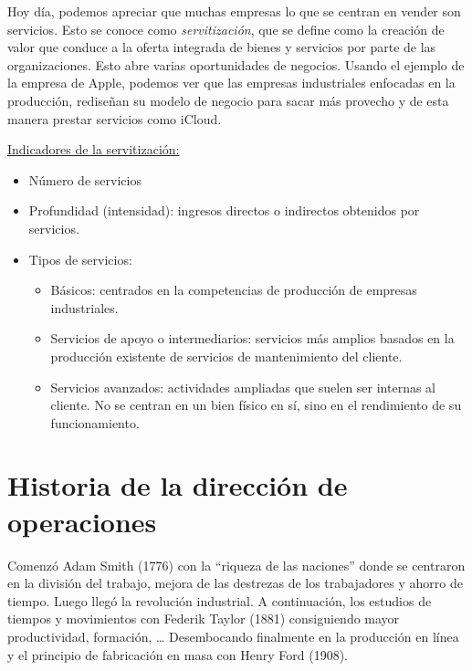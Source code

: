 \documentclass[12pt]{report} %
\providecommand{\tightlist}{%
  \setlength{\itemsep}{0pt}\setlength{\parskip}{0pt}}
\begin{document}
Hoy día, podemos apreciar que muchas empresas lo que se centran en
vender son servicios. Esto se conoce como \emph{servitización}, que se
define como la creación de valor que conduce a la oferta integrada de
bienes y servicios por parte de las organizaciones. Esto abre varias
oportunidades de negocios. Usando el ejemplo de la empresa de Apple,
podemos ver que las empresas industriales enfocadas en la producción,
rediseñan su modelo de negocio para sacar más provecho y de esta manera
prestar servicios como iCloud.

\underline{Indicadores de la servitización:}

\begin{itemize}
\tightlist
\item
  Número de servicios\\
\item
  Profundidad (intensidad): ingresos directos o indirectos obtenidos por
  servicios.\\
\item
  Tipos de servicios:

  \begin{itemize}
  \tightlist
  \item
    Básicos: centrados en la competencias de producción de empresas
    industriales.\\
  \item
    Servicios de apoyo o intermediarios: servicios más amplios basados
    en la producción existente de servicios de mantenimiento del
    cliente.\\
  \item
    Servicios avanzados: actividades ampliadas que suelen ser internas
    al cliente. No se centran en un bien físico en sí, sino en el
    rendimiento de su funcionamiento.
  \end{itemize}
\end{itemize}

\hypertarget{historia-de-la-direcciuxf3n-de-operaciones}{%
\section{Historia de la dirección de
operaciones}\label{historia-de-la-direcciuxf3n-de-operaciones}}

Comenzó Adam Smith (1776) con la ``riqueza de las naciones'' donde se
centraron en la división del trabajo, mejora de las destrezas de los
trabajadores y ahorro de tiempo. Luego llegó la revolución industrial. A
continuación, los estudios de tiempos y movimientos con Federik Taylor
(1881) consiguiendo mayor productividad, formación, \ldots{}
Desembocando finalmente en la producción en línea y el principio de
fabricación en masa con Henry Ford (1908).
\end{document}
